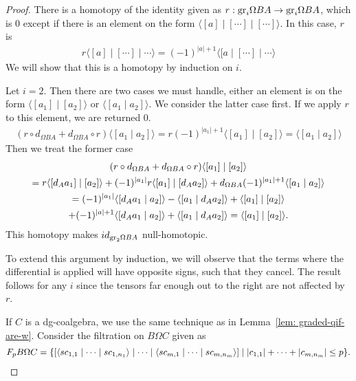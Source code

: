 \documentclass[../thesis.tex]{subfiles}
\begin{document}
\begin{proof}
                There is a homotopy of the identity given as $r: \tt{gr}_i \Omega BA \rightarrow \tt{gr}_i \Omega BA$, which is $0$ except if there is an element on the form $\langle [ a ] \mid [ \cdots ] \mid [ \cdots ] \rangle$. In this case, $r$ is 
                \begin{align*}                    
                    r\langle [a] \mid [\cdots] \mid \cdots \rangle = (-1)^{|a|+1} \langle [a \mid [\cdots] \mid \cdots \rangle
                \end{align*}
                We will show that this is a homotopy by induction on $i$.

                Let $i=2$. Then there are two cases we must handle, either an element is on the form $\langle [a_1] \mid [a_2] \rangle$ or $\langle [a_1 \mid a_2] \rangle$. We consider the latter case first. If we apply $r$ to this element, we are returned $0$. 
                \begin{align*}
                    (r\circ d_{\Omega BA}+d_{\Omega BA}\circ r)\langle [a_1 \mid a_2] \rangle = r (-1)^{|a_1|+1}\langle [a_1] \mid [a_2] \rangle = \langle [a_1 \mid a_2] \rangle
                \end{align*}
                Then we treat the former case
                \begin{multline*}
                    (r\circ d_{\Omega BA}+d_{\Omega BA}\circ r)\langle [a_1] \mid [a_2] \rangle \\ 
                    = r\langle [d_Aa_1] \mid [a_2] \rangle + (-1)^{|a_1|}r\langle [a_1] \mid [d_Aa_2] \rangle + d_{\Omega BA}(-1)^{|a_1|+1}\langle [a_1 \mid a_2]\rangle \\
                    = (-1)^{|a_1|}\langle [ d_Aa_1 \mid a_2] \rangle - \langle [a_1 \mid d_Aa_2] \rangle + \langle [a_1] \mid [a_2] \rangle \\
                    + (-1)^{|a|+1}\langle [d_Aa_1 \mid a_2] \rangle  + \langle [a_1 \mid d_Aa_2] \rangle = \langle [a_1] \mid [a_2] \rangle\tt{.}
                \end{multline*}
                This homotopy makes $id_{\tt{gr}_2 \Omega BA}$ null-homotopic.

                To extend this argument by induction, we will observe that the terms where the differential is applied will have opposite signs, such that they cancel. The result follows for any $i$ since the tensors far enough out to the right are not affected by $r$.

                If $C$ is a dg-coalgebra, we use the same technique as in Lemma~\ref{lem: graded-qif-are-w}. Consider the filtration on $B\Omega C$ given as
                \begin{align*}
                    F_pB\Omega C = \startset{[\langle sc_{1,1}\mid \cdots \mid sc_{1,n_1}\rangle \mid \cdots \mid \langle sc_{m, 1}\mid \cdots \mid sc_{m,n_m} \rangle] \mid |c_{1,1}| + \cdots + |c_{m,n_m}|\leq p}\text{.}
                \end{align*}
                

\end{proof}
\end{document}
